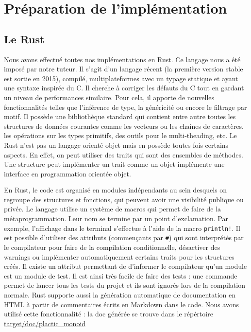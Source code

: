 \section{Préparation de l'implémentation}
\subsection{Le Rust}
Nous avons effectué toutes nos implémentations en Rust. Ce langage nous a été imposé par notre tuteur. Il s'agit d'un langage récent (la première version stable est sortie en 2015), compilé, multiplateformes avec un typage statique et ayant une syntaxe inspirée du C. Il cherche à corriger les défauts du C tout en gardant un niveau de performances similaire. Pour cela, il apporte de nouvelles fonctionnalités telles que l'inférence de type, la généricité ou encore le filtrage par motif. Il possède une bibliothèque standard qui contient entre autre toutes les structures de données courantes comme les vecteurs ou les chaines de caractères, les opérations sur les types primitifs, des outils pour le multi-theading, etc. Le Rust n'est pas un langage orienté objet mais en possède toutes fois certains aspects. En effet, on peut utiliser des traits qui sont des ensembles de méthodes. Une structure peut implémenter un trait comme un objet implémente une interface en programmation orientée objet.

En Rust, le code est organisé en modules indépendants au sein desquels on regroupe des structures et fonctions, qui peuvent avoir une visibilité publique ou privée. Le langage utilise un système de macros qui permet de faire de la métaprogrammation. Leur nom se termine par un point d'exclamation. Par exemple, l'affichage dans le terminal s'effectue à l'aide de la macro \texttt{println!}. Il est possible d'utiliser des attributs (commençants par \texttt{\#}) qui sont interprétés par le compilateur pour faire de la compilation conditionnelle, désactiver des warnings ou implémenter automatiquement certains traits pour les structures créés. Il existe un attribut permettant de d'informer le compilateur qu'un module est un module de test. Il est ainsi très facile de faire des tests : une commande permet de lancer tous les tests du projet et ils sont ignorés lors de la compilation normale. Rust supporte aussi la génération automatique de documentation en HTML à partir de commentaires écrits en Markdown dans le code. Nous avons utilisé cette fonctionnalité : la doc générée se trouve dans le répértoire \href{https://gitlab.isima.fr/leorober/plactic-monoid/-/tree/master/target/doc/plactic_monoid}{target/doc/plactic\_monoid}

